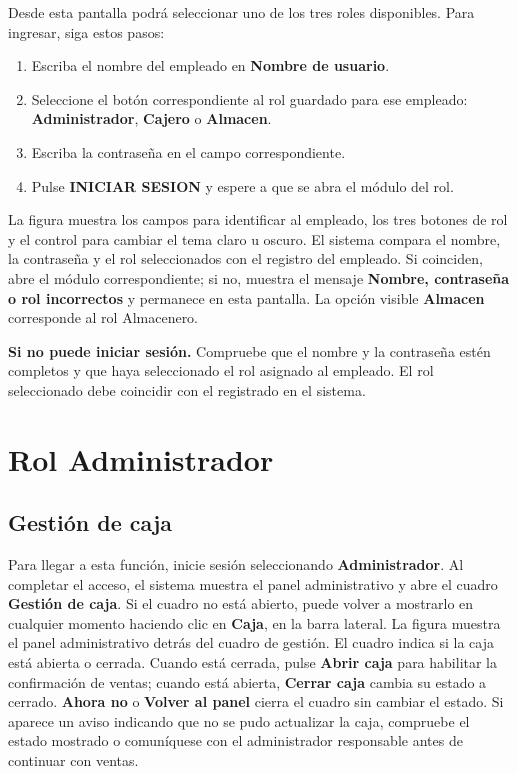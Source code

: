 \documentclass[12pt,a4paper]{article}
\begin{document}
Desde esta pantalla podrá seleccionar uno de los tres roles disponibles. Para ingresar, siga estos pasos:
\begin{enumerate}
\item Escriba el nombre del empleado en \textbf{Nombre de usuario}.
\item Seleccione el botón correspondiente al rol guardado para ese empleado: \textbf{Administrador}, \textbf{Cajero} o \textbf{Almacen}.
\item Escriba la contraseña en el campo correspondiente.
\item Pulse \textbf{INICIAR SESION} y espere a que se abra el módulo del rol.
\end{enumerate}
La figura muestra los campos para identificar al empleado, los tres botones de rol y el control para cambiar el tema claro u oscuro. El sistema compara el nombre, la contraseña y el rol seleccionados con el registro del empleado. Si coinciden, abre el módulo correspondiente; si no, muestra el mensaje \textbf{Nombre, contraseña o rol incorrectos} y permanece en esta pantalla. La opción visible \textbf{Almacen} corresponde al rol Almacenero.
\begin{warningbox}\textbf{Si no puede iniciar sesión.} Compruebe que el nombre y la contraseña estén completos y que haya seleccionado el rol asignado al empleado. El rol seleccionado debe coincidir con el registrado en el sistema.\end{warningbox}

\section{Rol Administrador}
\subsection{Gestión de caja}
Para llegar a esta función, inicie sesión seleccionando \textbf{Administrador}. Al completar el acceso, el sistema muestra el panel administrativo y abre el cuadro \textbf{Gestión de caja}. Si el cuadro no está abierto, puede volver a mostrarlo en cualquier momento haciendo clic en \textbf{Caja}, en la barra lateral.
La figura muestra el panel administrativo detrás del cuadro de gestión. El cuadro indica si la caja está abierta o cerrada. Cuando está cerrada, pulse \textbf{Abrir caja} para habilitar la confirmación de ventas; cuando está abierta, \textbf{Cerrar caja} cambia su estado a cerrado. \textbf{Ahora no} o \textbf{Volver al panel} cierra el cuadro sin cambiar el estado. Si aparece un aviso indicando que no se pudo actualizar la caja, compruebe el estado mostrado o comuníquese con el administrador responsable antes de continuar con ventas.
\end{document}
